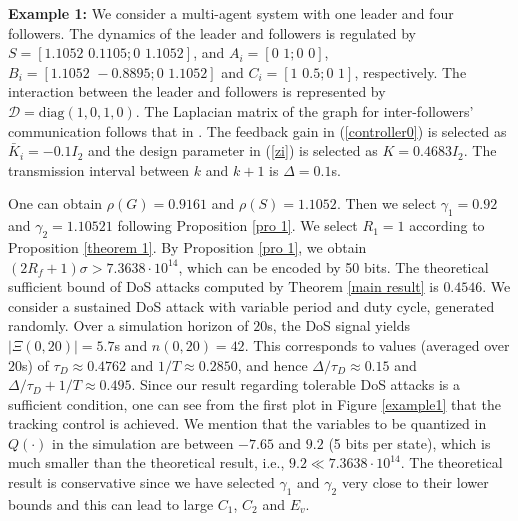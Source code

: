 \documentclass{autart}
\begin{document}
\textbf{Example 1:}
We consider a multi-agent system with one leader and four followers. The dynamics of the leader and followers is regulated by $S=[1.1052\,\, 0.1105; 0\,\, 1.1052]$, and $A_i=[0 \,\,1; 0\,\, 0]$, $B_i=[1.1052\,\, -0.8895; 0\,\, 1.1052]$ and $C_i=[1 \,\,0.5; 0\,\, 1]$, respectively. 
The interaction between the leader and followers is represented by $\mathcal D=\text{diag}(1, 0, 1, 0)$. The Laplacian matrix of the graph for inter-followers' communication follows that in \cite{feng2023tcns}. The feedback gain in (\ref{controller0}) is selected as $\bar K_i=-0.1I_2$ and the design parameter in (\ref{zi}) is selected as $K=0.4683I_2$. The transmission interval between $k$ and $k+1$ is $\Delta=0.1$s. 



One can obtain $\rho(G)=0.9161$ and $\rho(S)=1.1052$. Then we select $\gamma_1=0.92$ and $\gamma_2=1.10521$ following Proposition \ref{pro 1}. We select $R_1=1$ according to Proposition \ref{theorem 1}. By Proposition \ref{pro 1}, we obtain $(2R_f+1)\sigma>7.3638\cdot10^{14}$, which can be encoded by 50 bits. The theoretical sufficient bound of DoS attacks computed by Theorem \ref{main result} is $0.4546$. 
We consider a sustained DoS attack with variable period and duty cycle, generated randomly.
Over a simulation horizon of $20$s, the DoS 
signal yields $|\Xi(0,20)|=5.7$s and $n(0,20)=42$. 
This corresponds to values (averaged over $20$s) 
of $\tau_D\approx 0.4762$ and $1/T \approx 0.2850$,
and hence $\Delta/\tau_D \approx 0.15$ and
$
\Delta/\tau_D + 1/T \approx 0.495
$.
Since our result regarding tolerable DoS attacks is a sufficient condition, one can see from the first plot in Figure \ref{example1} that the tracking control is achieved. We mention that the variables to be quantized in $Q(\cdot)$ in the simulation are between $-7.65$ and $9.2$ (5 bits per state), which is much smaller than the theoretical result, i.e., $  9.2 \ll 7.3638\cdot10^{14} $. The theoretical result is conservative since we have selected $\gamma_1$ and $\gamma_2$ very close to their lower bounds and this can lead to large $C_1$, $C_2$ and $E_v$.  
\end{document}
